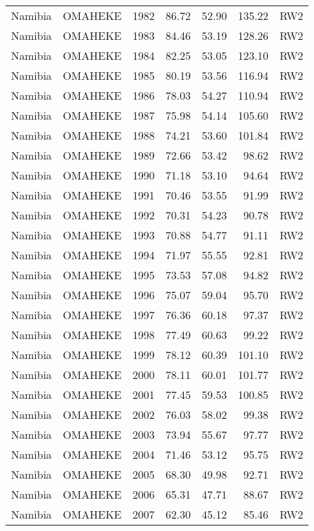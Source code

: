 \begin{longtable}{lllrrrl}
  Namibia & OMAHEKE & 1982 & 86.72 & 52.90 & 135.22 & RW2 \\ 
  Namibia & OMAHEKE & 1983 & 84.46 & 53.19 & 128.26 & RW2 \\ 
  Namibia & OMAHEKE & 1984 & 82.25 & 53.05 & 123.10 & RW2 \\ 
  Namibia & OMAHEKE & 1985 & 80.19 & 53.56 & 116.94 & RW2 \\ 
  Namibia & OMAHEKE & 1986 & 78.03 & 54.27 & 110.94 & RW2 \\ 
  Namibia & OMAHEKE & 1987 & 75.98 & 54.14 & 105.60 & RW2 \\ 
  Namibia & OMAHEKE & 1988 & 74.21 & 53.60 & 101.84 & RW2 \\ 
  Namibia & OMAHEKE & 1989 & 72.66 & 53.42 & 98.62 & RW2 \\ 
  Namibia & OMAHEKE & 1990 & 71.18 & 53.10 & 94.64 & RW2 \\ 
  Namibia & OMAHEKE & 1991 & 70.46 & 53.55 & 91.99 & RW2 \\ 
  Namibia & OMAHEKE & 1992 & 70.31 & 54.23 & 90.78 & RW2 \\ 
  Namibia & OMAHEKE & 1993 & 70.88 & 54.77 & 91.11 & RW2 \\ 
  Namibia & OMAHEKE & 1994 & 71.97 & 55.55 & 92.81 & RW2 \\ 
  Namibia & OMAHEKE & 1995 & 73.53 & 57.08 & 94.82 & RW2 \\ 
  Namibia & OMAHEKE & 1996 & 75.07 & 59.04 & 95.70 & RW2 \\ 
  Namibia & OMAHEKE & 1997 & 76.36 & 60.18 & 97.37 & RW2 \\ 
  Namibia & OMAHEKE & 1998 & 77.49 & 60.63 & 99.22 & RW2 \\ 
  Namibia & OMAHEKE & 1999 & 78.12 & 60.39 & 101.10 & RW2 \\ 
  Namibia & OMAHEKE & 2000 & 78.11 & 60.01 & 101.77 & RW2 \\ 
  Namibia & OMAHEKE & 2001 & 77.45 & 59.53 & 100.85 & RW2 \\ 
  Namibia & OMAHEKE & 2002 & 76.03 & 58.02 & 99.38 & RW2 \\ 
  Namibia & OMAHEKE & 2003 & 73.94 & 55.67 & 97.77 & RW2 \\ 
  Namibia & OMAHEKE & 2004 & 71.46 & 53.12 & 95.75 & RW2 \\ 
  Namibia & OMAHEKE & 2005 & 68.30 & 49.98 & 92.71 & RW2 \\ 
  Namibia & OMAHEKE & 2006 & 65.31 & 47.71 & 88.67 & RW2 \\ 
  Namibia & OMAHEKE & 2007 & 62.30 & 45.12 & 85.46 & RW2 \\ 

\end{longtable}

